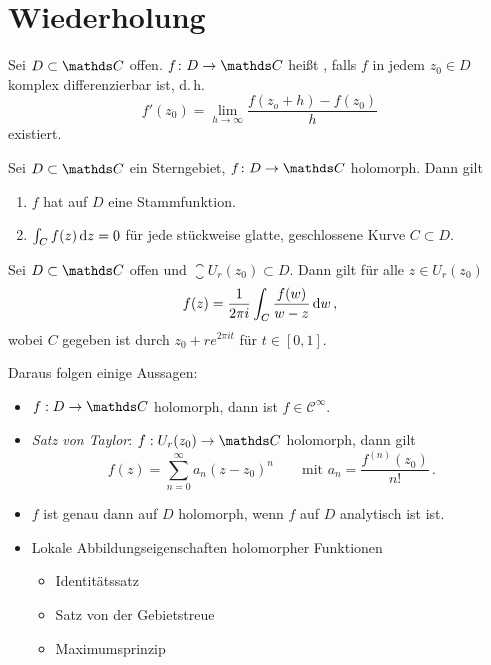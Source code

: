 \setcounter{chapter}{-1}
\chapter{Wiederholung}

\begin{defi}
Sei $D \subset \CC$ offen. $f\colon D \ra \CC$ heißt , falls $f$ in jedem $z_0 \in D$ komplex differenzierbar ist, d.\,h.
\[
	f'(z_0) = \lim_{h \to \infty} \frac{f(z_o + h)-f(z_0)}{h}
\]
existiert.
\end{defi}

\begin{satz}
Sei $D\subset\CC$ ein Sterngebiet, $f\colon D \ra \CC$ holomorph.
Dann gilt
\begin{enumerate}
\item $f$ hat auf $D$ eine Stammfunktion.
\item $\int _ C f(z) \,\mathrm{d} z = 0$ für jede stückweise glatte, geschlossene Kurve $C \subset D$.
\end{enumerate}
\end{satz}

\begin{satz}
Sei $D\subset\CC$ offen und $\closure{U_r(z_0)} \subset D$. Dann gilt für alle $z\in U_r(z_0)$
\[
	f(z)
	= \frac{1}{2\pi i} \int _ C \frac{f(w)}{w-z}\,\mathrm{d} w
	\,,
\]
wobei $C$ gegeben ist durch $z_0 + re^{2\pi it}$ für $t\in[0,1]$.
\end{satz}

Daraus folgen einige Aussagen:
\begin{itemize}
\item $f:D \ra \CC$ holomorph, dann ist $f \in \mathcal{C}^\infty$.
\item \emph{Satz von Taylor}: $f:U_r(z_0) \ra \CC$ holomorph, dann gilt
\[
	f(z) = \sum _{n=0}^\infty a_n(z-z_0)^n \qquad \text{mit } a_n = \frac{f^{(n)}(z_0)}{n!}\,.
\]
\item $f$ ist genau dann auf $D$ holomorph, wenn $f$ auf $D$ analytisch ist ist.
\item Lokale Abbildungseigenschaften holomorpher Funktionen
\begin{itemize}
\item Identitätssatz
\item Satz von der Gebietstreue
\item Maximumsprinzip
\end{itemize}
\end{itemize}

